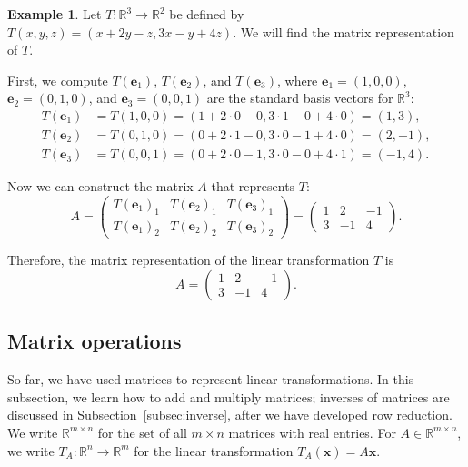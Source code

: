 \documentclass[11pt]{article}
\theoremstyle{definition}
\newtheorem{example}[definition]{Example}
\theoremstyle{plain}
\theoremstyle{remark}
\begin{document}
\begin{example}
    Let $T: \mathbb{R}^3 \to \mathbb{R}^2$ be defined by $T(x, y, z) = (x + 2y - z, 3x - y + 4z)$. We will find the matrix representation of $T$.

    First, we compute $T(\mathbf{e}_1)$, $T(\mathbf{e}_2)$, and $T(\mathbf{e}_3)$, where $\mathbf{e}_1 = (1, 0, 0)$, $\mathbf{e}_2 = (0, 1, 0)$, and $\mathbf{e}_3 = (0, 0, 1)$ are the standard basis vectors for $\mathbb{R}^3$:
    \begin{align*}
        T(\mathbf{e}_1) &= T(1, 0, 0) = (1 + 2 \cdot 0 - 0, 3 \cdot 1 - 0 + 4 \cdot 0) = (1, 3), \\
        T(\mathbf{e}_2) &= T(0, 1, 0) = (0 + 2 \cdot 1 - 0, 3 \cdot 0 - 1 + 4 \cdot 0) = (2, -1), \\
        T(\mathbf{e}_3) &= T(0, 0, 1) = (0 + 2 \cdot 0 - 1, 3 \cdot 0 - 0 + 4 \cdot 1) = (-1, 4).
    \end{align*}

    Now we can construct the matrix $A$ that represents $T$:
    \[A = \begin{pmatrix}
        T(\mathbf{e}_1)_1 & T(\mathbf{e}_2)_1 & T(\mathbf{e}_3)_1 \\
        T(\mathbf{e}_1)_2 & T(\mathbf{e}_2)_2 & T(\mathbf{e}_3)_2
    \end{pmatrix} = \begin{pmatrix}
        1 & 2 & -1 \\
        3 & -1 & 4
    \end{pmatrix}.\]

    Therefore, the matrix representation of the linear transformation $T$ is
    \[A = \begin{pmatrix}
        1 & 2 & -1 \\
        3 & -1 & 4
    \end{pmatrix}.\]
\end{example}

\subsection{Matrix operations}

So far, we have used matrices to represent linear transformations. In this subsection, we learn how to add and multiply matrices; inverses of matrices are discussed in Subsection~\ref{subsec:inverse}, after we have developed row reduction. We write $\mathbb{R}^{m \times n}$ for the set of all $m \times n$ matrices with real entries. For $A \in \mathbb{R}^{m \times n}$, we write $T_A: \mathbb{R}^n \to \mathbb{R}^m$ for the linear transformation $T_A(\mathbf{x}) = A\mathbf{x}$.
\end{document}

